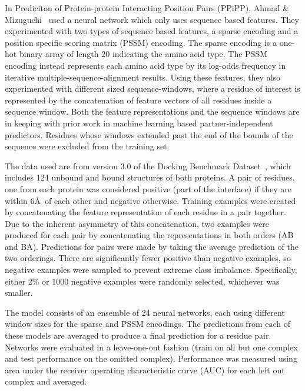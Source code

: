 In Prediciton of Protein-protein Interacting Position Pairs (PPiPP), Ahmad \& Mizuguchi~\cite{ahmad2011} used a neural network which only uses sequence based features.
They experimented with two types of sequence based features, a sparse encoding and a position specific scoring matrix (PSSM) encoding.
The sparse encoding is a one-hot binary array of length 20 indicating the amino acid type.
The PSSM encoding instead represents each amino acid type by its log-odds frequency in iterative multiple-sequence-alignment results.
Using these features, they also experimented with different sized sequence-windows, where a residue of interest is represented by the concatenation of feature vectors of all residues inside a sequence window.
Both the feature representations and the sequence windows are in keeping with prior work in machine learning based partner-independent predictors.
Residues whose windows extended past the end of the bounds of the sequence were excluded from the training set.

The data used are from version 3.0 of the Docking Benchmark Dataset~\cite{hwang2008}, which includes 124 unbound and bound structures of both proteins.
A pair of residues, one from each protein was considered positive (part of the interface) if they are within 6\AA~of each other and negative otherwise.
Training examples were created by concatenating the feature representation of each residue in a pair together.
Due to the inherent asymmetry of this concatenation, two examples were produced for each pair by concatenating the representations in both orders (AB and BA).
Predictions for pairs were made by taking the average prediction of the two orderings.
There are significantly fewer positive than negative examples, so negative examples were sampled to prevent extreme class imbalance.
Specifically, either 2\% or 1000 negative examples were randomly selected, whichever was smaller.

The model consists of an ensemble of 24 neural networks, each using different window sizes for the sparse and PSSM encodings.
The predictions from each of these models are averaged to produce a final prediction for a residue pair.
Networks were evaluated in a leave-one-out fashion (train on all but one complex and test performance on the omitted complex).
Performance was measured using area under the receiver operating characteristic curve (AUC) for each left out complex and averaged.

